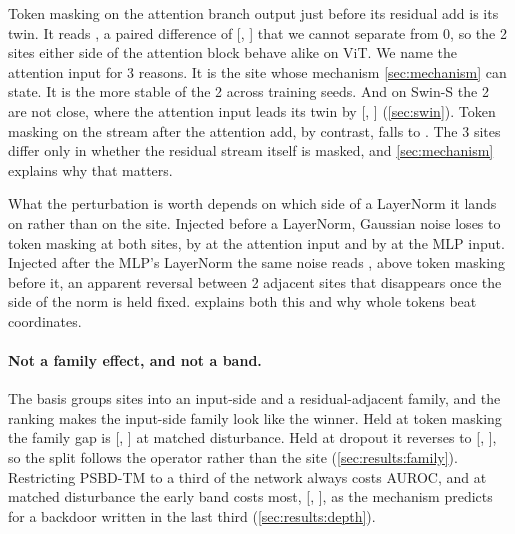 Token masking on the attention branch output just before its residual add is its twin. It reads \StaircaseOperatorsBeforeAttentionResidualTokenMaskAuroc{}, a paired difference of \StaircaseOperatorsBeforeAttentionResidualTokenMaskGain{} [\StaircaseOperatorsBeforeAttentionResidualTokenMaskGainLow{}, \StaircaseOperatorsBeforeAttentionResidualTokenMaskGainHigh{}] that we cannot separate from 0, so the 2 sites either side of the attention block behave alike on ViT. We name the attention input for 3 reasons. It is the site whose mechanism \cref{sec:mechanism} can state. It is the more stable of the 2 across training seeds. And on Swin-S the 2 are not close, where the attention input leads its twin by \SwinGainRecommendedMinusTwin{} [\SwinGainRecommendedMinusTwinLow{}, \SwinGainRecommendedMinusTwinHigh{}] (\cref{sec:swin}). Token masking on the stream after the attention add, by contrast, falls to \StaircaseOperatorsAfterAttentionResidualTokenMaskAuroc{}. The 3 sites differ only in whether the residual stream itself is masked, and \cref{sec:mechanism} explains why that matters.

What the perturbation is worth depends on which side of a LayerNorm it lands on rather than on the site. Injected before a LayerNorm, Gaussian noise loses to token masking at both sites, by \StaircaseOperatorsBeforeAttentionNormGaussianGain{} at the attention input and by \StaircaseOperatorsBeforeMlpNormGaussianGain{} at the MLP input. Injected after the MLP's LayerNorm the same noise reads \StaircaseOperatorsBeforeMlpGaussianAuroc{}, above token masking before it, an apparent reversal between 2 adjacent sites that disappears once the side of the norm is held fixed.  explains both this and why whole tokens beat coordinates.

\paragraph{Not a family effect, and not a band.}
The basis groups sites into an input-side and a residual-adjacent family, and the ranking makes the input-side family look like the winner. Held at token masking the family gap is \FamilyGapMatched{} [\FamilyGapMatchedLow{}, \FamilyGapMatchedHigh{}] at matched disturbance. Held at dropout it reverses to \FamilyGapDropoutMatched{} [\FamilyGapDropoutMatchedLow{}, \FamilyGapDropoutMatchedHigh{}], so the split follows the operator rather than the site (\cref{sec:results:family}). Restricting PSBD-TM to a third of the network always costs AUROC, and at matched disturbance the early band costs most, \BandOneFourMinusAllInputSide{} [\BandOneFourMinusAllInputSideLow{}, \BandOneFourMinusAllInputSideHigh{}], as the mechanism predicts for a backdoor written in the last third (\cref{sec:results:depth}).

